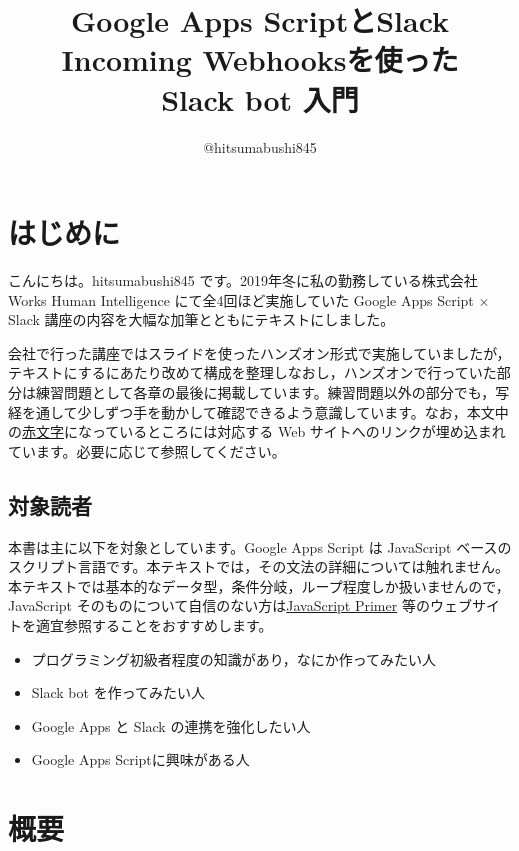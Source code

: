 \documentclass[uplatex,a4j]{jsarticle}
\title{Google Apps ScriptとSlack Incoming Webhooksを使った\\Slack bot 入門}
\author{@hitsumabushi845}
\date{}
\begin{document}
\VerbatimFootnotes

\maketitle
\tableofcontents

\clearpage

\section{はじめに}

こんにちは。hitsumabushi845 です。2019年冬に私の勤務している株式会社 Works Human Intelligence にて全4回ほど実施していた Google Apps Script $\times$ Slack 講座の内容を大幅な加筆とともにテキストにしました。


会社で行った講座ではスライドを使ったハンズオン形式で実施していましたが，テキストにするにあたり改めて構成を整理しなおし，ハンズオンで行っていた部分は練習問題として各章の最後に掲載しています。練習問題以外の部分でも，写経を通して少しずつ手を動かして確認できるよう意識しています。なお，本文中の\href{http://google.co.jp}{赤文字}になっているところには対応する Web サイトへのリンクが埋め込まれています。必要に応じて参照してください。

\subsection{対象読者}

本書は主に以下を対象としています。Google Apps Script は JavaScript ベースのスクリプト言語です。本テキストでは，その文法の詳細については触れません。本テキストでは基本的なデータ型，条件分岐，ループ程度しか扱いませんので，JavaScript そのものについて自信のない方は\href{https://jsprimer.net/}{JavaScript Primer} 等のウェブサイトを適宜参照することをおすすめします。

\begin{itemize}
\item プログラミング初級者程度の知識があり，なにか作ってみたい人
\item Slack bot を作ってみたい人
\item Google Apps と Slack の連携を強化したい人
\item Google Apps Scriptに興味がある人
\end{itemize}

\clearpage

\section{概要}
\end{document}
